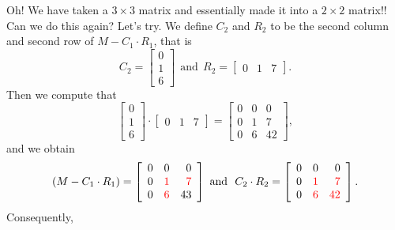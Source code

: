 Oh! We have taken a $3 \times 3$ matrix and essentially made it into a $2 \times 2 $ matrix!! Can we do this again? Let's try. We define $C_2$  and $R_2$  to be the second column and second row of $M- C_1 \cdot R_1$, that is
$$C_2=\left[\begin{array}{r} 
    0  \\ 1 \\ 6  \end{array}  \right]~~\text{and}~~R_2=\left[\begin{array}{rrr} 
   0   &  1   &  7 \end{array}  \right].  $$
 Then we compute that 
$$
 \left[\begin{array}{r} 
    0  \\ 1 \\ 6  \end{array}  \right] \cdot \left[\begin{array}{rrr} 
   0   &  1   &  7 \end{array}  \right] = \left[\begin{array}{rrr} 
       0  &   0  &   0 \\
     0   &  1   &  7 \\
     0   &  6   & 42 \end{array}  \right],
$$
 and we obtain
 $$
\left(M - C_1 \cdot R_1 \right) = \left[\begin{array}{rrr} 
       0  &   0  &   0 \\
     0   & \color{red} 1   &  \color{red} 7 \\
     0   &  \color{red} 6   & 43 \end{array}  \right] \text{ and~~} C_2 \cdot R_2 = \left[\begin{array}{rrr} 
       0  &   0  &   0 \\
     0   &  \color{red} 1   & \color{red}  7 \\
     0   & \color{red}  6   & \color{red} 42 \end{array}  \right]. 
 $$
Consequently, 
